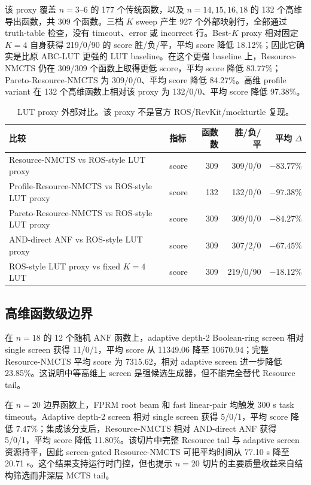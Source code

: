\documentclass[UTF8,fontset=macnew,11pt]{ctexart}
\newcommand{\method}{Resource-NMCTS}
\newcommand{\screen}{Boolean-ring screen}
\newcommand{\anf}{\ensuremath{\mathrm{ANF}}}
\newcommand{\mcts}{\ensuremath{\mathrm{MCTS}}}
\begin{document}
该 proxy 覆盖 $n=3$--$6$ 的 177 个传统函数，以及 $n=14,15,16,18$ 的 132 个高维导出函数，共 309 个函数。三档 $K$ sweep 产生 927 个外部映射行，全部通过 truth-table 检查，没有 timeout、error 或 incorrect 行。Best-$K$ proxy 相对固定 $K=4$ 自身获得 219/0/90 的 score 胜/负/平，平均 score 降低 18.12\%；因此它确实是比原 ABC-LUT 更强的 LUT baseline。在这个更强 baseline 上，\method{} 仍在 309/309 个函数上取得更低 score，平均 score 降低 83.77\%；Pareto-\method{} 为 309/0/0、平均 score 降低 84.27\%。高维 profile variant 在 132 个高维函数上相对该 proxy 为 132/0/0、平均 score 降低 97.38\%。

\begin{table}[H]
\centering
\scriptsize
\caption{LUT proxy 外部对比。该 proxy 不是官方 ROS/RevKit/mockturtle 复现。}
\label{tab:ros-lut}
\begin{tabular}{llrrr}
\toprule
比较 & 指标 & 函数数 & 胜/负/平 & 平均 $\Delta$ \\
\midrule
\method{} vs ROS-style LUT proxy & score & 309 & 309/0/0 & $-83.77\%$ \\
Profile-\method{} vs ROS-style LUT proxy & score & 132 & 132/0/0 & $-97.38\%$ \\
Pareto-\method{} vs ROS-style LUT proxy & score & 309 & 309/0/0 & $-84.27\%$ \\
AND-direct ANF vs ROS-style LUT proxy & score & 309 & 307/2/0 & $-67.45\%$ \\
ROS-style LUT proxy vs fixed $K=4$ LUT & score & 309 & 219/0/90 & $-18.12\%$ \\
\bottomrule
\end{tabular}
\end{table}

\subsection{高维函数级边界}

在 $n=18$ 的 12 个随机 \anf{} 函数上，adaptive depth-2 \screen{} 相对 single screen 获得 11/0/1，平均 score 从 11349.06 降至 10670.94；完整 \method{} 平均 score 为 7315.62，相对 adaptive screen 进一步降低 23.85\%。这说明中等高维上 screen 是强候选生成器，但不能完全替代 Resource tail。

在 $n=20$ 边界函数上，FPRM root beam 和 fast linear-pair 均触发 300 s task timeout。Adaptive depth-2 screen 相对 single screen 获得 5/0/1，平均 score 降低 7.47\%；集成该分支后，\method{} 相对 AND-direct ANF 获得 5/0/1，平均 score 降低 11.80\%。该切片中完整 Resource tail 与 adaptive screen 资源持平，因此 screen-gated \method{} 可把平均时间从 77.10 s 降至 20.71 s。这个结果支持运行时门控，但也提示 $n=20$ 切片的主要质量收益来自结构筛选而非深层 \mcts{} tail。
\end{document}
